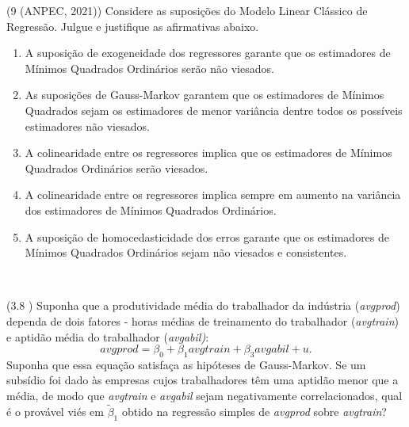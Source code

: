 \documentclass[12pt,letterpaper, onecolumn]{exam}
\begin{document}
\begin{questions}

    \question (9 (ANPEC, 2021)) Considere as suposições do Modelo Linear Clássico de Regressão. Julgue e justifique as afirmativas abaixo.
    \begin{enumerate}[label=(\arabic*), start=0]
    \item A suposição de exogeneidade dos regressores garante que os estimadores de Mínimos Quadrados Ordinários serão não viesados.
    \item As suposições de Gauss-Markov garantem que os estimadores de Mínimos Quadrados sejam os estimadores de menor variância dentre todos os possíveis estimadores não viesados.
    \item A colinearidade entre os regressores implica que os estimadores de Mínimos Quadrados Ordinários serão viesados.
    \item A colinearidade entre os regressores implica sempre em aumento na variância dos estimadores de Mínimos Quadrados Ordinários.
    \item A suposição de homocedasticidade dos erros garante que os estimadores de Mínimos Quadrados Ordinários sejam não viesados e consistentes.
    \end{enumerate}
\
\


    
    \question\qstar (3.8 \citep{wooldridge2016}) Suponha que a produtividade média do trabalhador da indústria (\textit{avgprod}) dependa de dois fatores - horas médias de treinamento do trabalhador (\textit{avgtrain}) e aptidão média do trabalhador (\textit{avgabil)}:\begin{equation*}
        avgprod = \beta_0 + \beta_1avgtrain + \beta_3 avgabil + u\text{.}
    \end{equation*}Suponha que essa equação satisfaça as hipóteses de Gauss-Markov. Se um subsídio foi dado às empresas cujos trabalhadores têm uma aptidão menor que a média, de modo que \textit{avgtrain} e \textit{avgabil} sejam negativamente correlacionados, qual é o provável viés em $\tilde\beta_1$ obtido na regressão simples de \textit{avgprod} sobre \textit{avgtrain}?


\
\



\end{questions}
\end{document}
